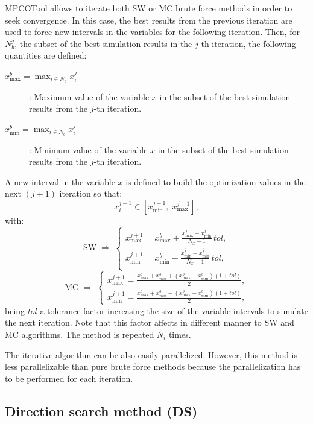 \documentclass[review,authoryear]{elsarticle}
\newcommand{\EQ}[2]
{\begin{equation}#1\label{#2}\end{equation}}
\begin{document}
MPCOTool allows to iterate both SW or MC brute force methods in
order to seek convergence. In this case, the best results from the previous
iteration are used to force new intervals in the variables for the following
iteration. Then, for $N_b^j$, the subset of the best simulation results in
the $j$-th iteration, the following quantities are defined:
\begin{description}
\item[$\displaystyle x_{\max}^b=\max_{i\in N_b}x_i^j$]: Maximum value of the
	variable $x$ in the subset of the best simulation results from the $j$-th
	iteration.
\item[$\displaystyle x_{\min}^b=\max_{i\in N_b}x_i^j$]: Minimum value of the
	variable $x$ in the subset of the best simulation results from the $j$-th
	iteration.
\end{description}
A new interval in the variable $x$ is defined to build the optimization values in the next $(j+1)$ iteration so that:
\EQ{x_i^{j+1}\in\left[x_{\min}^{j+1},\;x_{\max}^{j+1}\right],}
{EqIterationInterval}
with:
\[
	\mathrm{SW}\;\Rightarrow\;\left\{\begin{array}{c}
	\displaystyle
	x_{\max}^{j+1}=x_{\max}^b+\frac{x_{\max}^j-x_{\min}^j}{N_x-1}\,tol,\\
	\displaystyle
	x_{\min}^{j+1}=x_{\min}^b-\frac{x_{\min}^j-x_{\min}^j}{N_x-1}\,tol,\\
	\end{array}\right.
\]
\EQ
{
	\mathrm{MC}\;\Rightarrow\;\left\{\begin{array}{c}
	\displaystyle x_{\max}^{j+1}=\frac{x_{\max}^b+x_{\min}^b
	+\left(x_{\max}^b-x_{\min}^b\right)(1+tol)}{2},\\
	\displaystyle x_{\min}^{j+1}=\frac{x_{\max}^b+x_{\min}^b
	-\left(x_{\max}^b-x_{\min}^b\right)(1+tol)}{2},
	\end{array}\right.
}{EqIterationTolerance}
being $tol$ a tolerance factor increasing the size of the variable intervals to
simulate the next iteration. Note that this factor affects in different manner
to SW and MC algorithms. The method is repeated $N_i$ times.

The iterative algorithm can be also easily parallelized. However, this method is
less parallelizable than pure brute force methods because the parallelization
has to be performed for each iteration.

\subsection{Direction search method (DS)}
\end{document}
